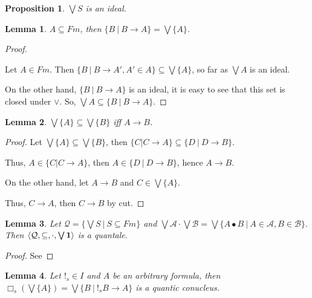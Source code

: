 \documentclass[a4paper]{article}
\theoremstyle{defin}
\theoremstyle{theorem}
\theoremstyle{prop}
\newtheorem{prop}{Proposition}
\theoremstyle{lemma}
\newtheorem{lemma}{Lemma}
\theoremstyle{ex}
\theoremstyle{col}
\begin{document}
\begin{prop}
  $\bigvee S$ is an ideal.
\end{prop}

\begin{lemma}
  $A \subseteq Fm$, then $\{ B \: | \: B \rightarrow A \} = \bigvee \{ A \}$.
\end{lemma}

\begin{proof}
$ $

Let $A \in Fm$. Then $\{ B \: | \: B \rightarrow A', A' \in A \} \subseteq \bigvee \{ A \}$,
so far as $\bigvee A$ is an ideal.

On the other hand, $\{ B \: | \: B \rightarrow A \}$ is an ideal, it is easy to see that this set is closed under $\lor$.
So, $\bigvee A \subseteq \{ B \: | \: B \rightarrow A \}$.
\end{proof}

\begin{lemma}
  $\bigvee \{ A \} \subseteq \bigvee \{ B \}$ iff $A \rightarrow B$.
\end{lemma}

\begin{proof}
  Let $\bigvee \{ A \} \subseteq \bigvee \{ B \}$,
  then $\{ C | C \rightarrow A \} \subseteq \{ D \: | \: D \rightarrow B \}$.

Thus, $A \in \{ C | C \rightarrow A \}$,
then $A \in \{ D \: | \: D \rightarrow B \}$, hence $A \rightarrow B$.

On the other hand, let $A \rightarrow B$ and $C \in \bigvee \{ A \}$.

Thus, $C \rightarrow A$, then $C \rightarrow B$ by cut.

\end{proof}

\begin{lemma}
  Let $\mathcal{Q} = \{ \bigvee S \: | \: S \subseteq Fm \}$ and $\bigvee \mathcal{A} \cdot \bigvee \mathcal{B} =
  \bigvee \{ A \bullet B \: | \: A \in \mathcal{A}, B \in \mathcal{B} \}$.
  Then $\langle \mathcal{Q}, \subseteq, \cdot, \bigvee{{\bf 1}}\rangle$ is a quantale.
\end{lemma}

\begin{proof}
  See
\end{proof}

\begin{lemma}
  Let $!_s \in I$ and $A$ be an arbitrary formula, then $\Box_s (\bigvee \{ A \}) = \bigvee \{ B \: | \: !_s B \rightarrow A \}$
  is a quantic conucleus.
\end{lemma}
\end{document}
